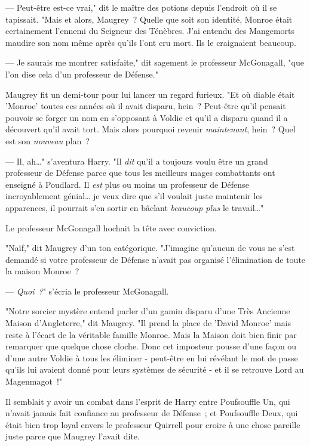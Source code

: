 --- Peut-être est-ce vrai," dit le maître des potions depuis l'endroit où il se tapissait. "Mais et alors, Maugrey~? Quelle que soit son identité, Monroe était certainement l'ennemi du Seigneur des Ténèbres. J'ai entendu des Mangemorts maudire son nom même après qu'ils l'ont cru mort. Ils le craignaient beaucoup.

--- Je saurais me montrer satisfaite," dit sagement le professeur McGonagall, "que l'on dise cela d'un professeur de Défense."

Maugrey fit un demi-tour pour lui lancer un regard furieux. "Et où diable était 'Monroe' toutes ces années où il avait disparu, hein~? Peut-être qu'il pensait pouvoir se forger un nom en s'opposant à Voldie et qu'il a disparu quand il a découvert qu'il avait tort. Mais alors pourquoi revenir \emph{maintenant}, hein~? Quel est son \emph{nouveau} plan~?

--- Il, ah…" s'aventura Harry. "Il \emph{dit} qu'il a toujours voulu être un grand professeur de Défense parce que tous les meilleurs mages combattants ont enseigné à Poudlard. Il \emph{est} plus ou moins un professeur de Défense incroyablement génial… je veux dire que s'il voulait juste maintenir les apparences, il pourrait s'en sortir en bâclant \emph{beaucoup plus} le travail…"

Le professeur McGonagall hochait la tête avec conviction.

"Naïf," dit Maugrey d'un ton catégorique. "J'imagine qu'aucun de vous ne s'est demandé si votre professeur de Défense n'avait pas organisé l'élimination de toute la maison Monroe~?

--- \emph{Quoi~?}" s'écria le professeur McGonagall.

"Notre sorcier mystère entend parler d'un gamin disparu d'une Très Ancienne Maison d'Angleterre," dit Maugrey. "Il prend la place de 'David Monroe' mais reste à l'écart de la véritable famille Monroe. Mais la Maison doit bien finir par remarquer que quelque chose cloche. Donc cet imposteur pousse d'une façon ou d'une autre Voldie à tous les éliminer - peut-être en lui révélant le mot de passe qu'ils lui avaient donné pour leurs systèmes de sécurité - et il se retrouve Lord au Magenmagot~!"

Il semblait y avoir un combat dans l'esprit de Harry entre Poufsouffle Un, qui n'avait jamais fait confiance au professeur de Défense~; et Poufsouffle Deux, qui était bien trop loyal envers le professeur Quirrell pour croire à une chose pareille juste parce que Maugrey l'avait dite.

